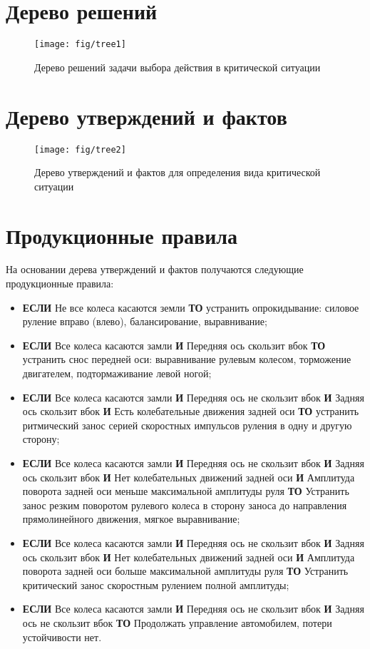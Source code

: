 \section{Дерево решений}

\begin{figure}[H]
	\centering
	\texttt{[image: fig/tree1]}
	\caption{Дерево решений задачи выбора действия в критической ситуации}
	\label{fig:tree1}
\end{figure}

\section{Дерево утверждений и фактов}

\begin{figure}[h]
	\centering
	\texttt{[image: fig/tree2]}
	\caption{Дерево утверждений и фактов для определения вида критической ситуации}
	\label{fig:tree2}
\end{figure}

\section{Продукционные правила}

На основании дерева утверждений и фактов получаются следующие продукционные правила:
\begin{itemize}
	\item \textbf{ЕСЛИ} Не все колеса касаются земли \textbf{ТО} устранить опрокидывание: силовое руление вправо (влево), балансирование, выравнивание;
	\item \textbf{ЕСЛИ} Все колеса касаются замли \textbf{И} Передняя ось скользит вбок \textbf{ТО} устранить снос передней оси: выравнивание рулевым колесом, торможение двигателем, подтормаживание левой ногой;
	\item \textbf{ЕСЛИ} Все колеса касаются замли \textbf{И} Передняя ось не скользит вбок \textbf{И} Задняя ось скользит вбок \textbf{И} Есть колебательные движения задней оси \textbf{ТО} устранить ритмический занос серией скоростных импульсов руления в одну и другую сторону;
	\item \textbf{ЕСЛИ} Все колеса касаются замли \textbf{И} Передняя ось не скользит вбок \textbf{И} Задняя ось скользит вбок \textbf{И} Нет колебательных движений задней оси \textbf{И} Амплитуда поворота задней оси меньше максимальной амплитуды руля \textbf{ТО} Устранить занос резким поворотом рулевого колеса в сторону заноса до направления прямолинейного движения, мягкое выравнивание;
	\item \textbf{ЕСЛИ} Все колеса касаются замли \textbf{И} Передняя ось не скользит вбок \textbf{И} Задняя ось скользит вбок \textbf{И} Нет колебательных движений задней оси \textbf{И} Амплитуда поворота задней оси больше максимальной амплитуды руля \textbf{ТО} Устранить критический занос скоростным рулением полной амплитуды;
	\item \textbf{ЕСЛИ} Все колеса касаются замли \textbf{И} Передняя ось не скользит вбок \textbf{И} Задняя ось не скользит вбок \textbf{ТО} Продолжать управление автомобилем, потери устойчивости нет.
\end{itemize}
